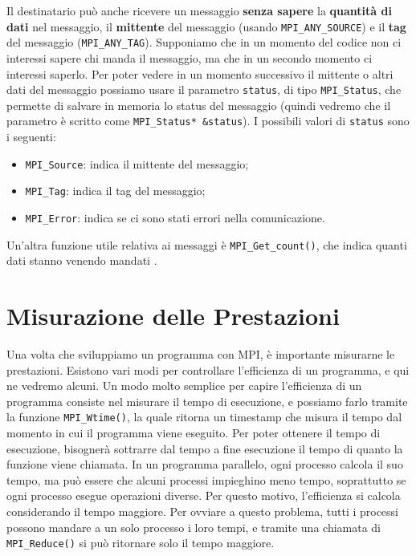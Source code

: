 Il destinatario può anche ricevere un messaggio \textbf{senza sapere} la \textbf{quantità di dati} nel messaggio, il \textbf{mittente} del messaggio (usando \verb|MPI_ANY_SOURCE|) e il \textbf{tag} del messaggio (\verb|MPI_ANY_TAG|).
\nl
Supponiamo che in un momento del codice non ci interessi sapere chi manda il messaggio, ma che in un secondo momento ci interessi saperlo. Per poter vedere in un momento successivo il mittente o altri dati del messaggio possiamo usare il parametro \verb|status|, di tipo \verb|MPI_Status|, che permette di salvare in memoria lo status del messaggio (quindi vedremo che il parametro è scritto come \verb|MPI_Status* &status|). I possibili valori di \verb|status| sono i seguenti:
\begin{itemize}
    \item \verb|MPI_Source|: indica il mittente del messaggio;
    \item \verb|MPI_Tag|: indica il tag del messaggio;
    \item \verb|MPI_Error|: indica se ci sono stati errori nella comunicazione.
\end{itemize}

Un'altra funzione utile relativa ai messaggi è \verb|MPI_Get_count()|, che indica quanti dati stanno venendo mandati .


\section{Misurazione delle Prestazioni}

Una volta che sviluppiamo un programma con MPI, è importante misurarne le prestazioni. Esistono vari modi per controllare l'efficienza di un programma, e qui ne vedremo alcuni.
\nl
Un modo molto semplice per capire l'efficienza di un programma consiste nel misurare il tempo di esecuzione, e possiamo farlo tramite la funzione \verb|MPI_Wtime()|, la quale ritorna un timestamp che misura il tempo dal momento in cui il programma viene eseguito. Per poter ottenere il tempo di esecuzione, bisognerà sottrarre dal tempo a fine esecuzione il tempo di quanto la funzione viene chiamata.
\nl
In un programma parallelo, ogni processo calcola il suo tempo, ma può essere che alcuni processi impieghino meno tempo, soprattutto se ogni processo esegue operazioni diverse. Per questo motivo, l'efficienza si calcola considerando il tempo maggiore. Per ovviare a questo problema, tutti i processi possono mandare a un solo processo i loro tempi, e tramite una chiamata di \verb|MPI_Reduce()| si può ritornare solo il tempo maggiore.

